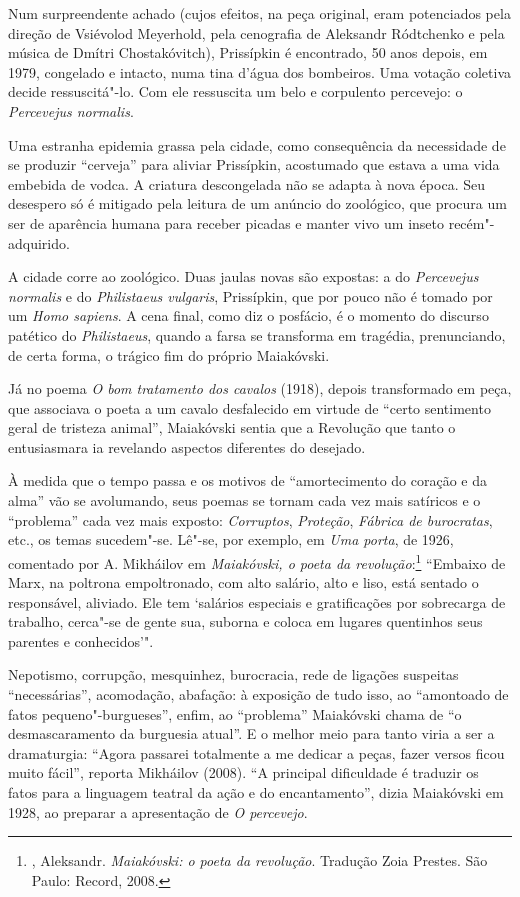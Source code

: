 {{{Num surpreendente achado (cujos efeitos, na peça original, eram
potenciados pela direção de Vsiévolod Meyerhold, pela cenografia de
Aleksandr Ródtchenko e pela música de Dmítri Chostakóvitch), Prissípkin
é encontrado, 50 anos depois, em 1979, congelado e intacto, numa tina
d'água dos bombeiros. Uma votação coletiva decide ressuscitá"-lo. Com ele
ressuscita um belo e corpulento percevejo: o \emph{Percevejus normalis}.

Uma estranha epidemia grassa pela cidade, como consequência da
necessidade de se produzir ``cerveja'' para aliviar Prissípkin, acostumado
que estava a uma vida embebida de vodca. A criatura descongelada não se
adapta à nova época. Seu desespero só é mitigado pela leitura de um
anúncio do zoológico, que procura um ser de aparência humana para
receber picadas e manter vivo um inseto recém"-adquirido.

A cidade corre ao zoológico. Duas jaulas novas são expostas: a do
\emph{Percevejus normalis} e do \emph{Philistaeus vulgaris},
Prissípkin, que por pouco não é tomado por um \emph{Homo sapiens}. A
cena final, como diz o posfácio, é o momento do discurso patético do
\emph{Philistaeus}, quando a farsa se transforma em tragédia,
prenunciando, de certa forma, o trágico fim do próprio Maiakóvski.

Já no poema \emph{O bom tratamento dos cavalos} (1918), depois
transformado em peça, que associava o poeta a um cavalo desfalecido em
virtude de ``certo sentimento geral de tristeza animal'', Maiakóvski
sentia que a Revolução que tanto o entusiasmara ia revelando aspectos
diferentes do desejado.

À medida que o tempo passa e os motivos de ``amortecimento do coração e
da alma'' vão se avolumando, seus poemas se tornam cada vez mais
satíricos e o ``problema'' cada vez mais exposto: \emph{Corruptos},
\emph{Proteção}, \emph{Fábrica de burocratas}, etc., os temas
sucedem"-se. Lê"-se, por exemplo, em \emph{Uma porta}, de 1926, comentado
por A. Mikháilov em \emph{Maiakóvski, o poeta da revolução}:\footnote{,
  Aleksandr. \emph{Maiakóvski: o poeta da revolução}. Tradução Zoia
  Prestes. São Paulo: Record, 2008.} ``Embaixo de Marx, na poltrona
empoltronado, com alto salário, alto e liso, está sentado o responsável,
aliviado. Ele tem `salários especiais e gratificações por sobrecarga de
trabalho, cerca"-se de gente sua, suborna e coloca em lugares quentinhos
seus parentes e conhecidos'".

Nepotismo, corrupção, mesquinhez, burocracia, rede de ligações suspeitas
``necessárias'', acomodação, abafação: à exposição de tudo isso, ao
``amontoado de fatos pequeno"-burgueses'', enfim, ao ``problema'' Maiakóvski
chama de ``o desmascaramento da burguesia atual''. E o melhor meio para
tanto viria a ser a dramaturgia: ``Agora passarei totalmente a me dedicar
a peças, fazer versos ficou muito fácil'', reporta Mikháilov (2008). ``A
principal dificuldade é traduzir os fatos para a linguagem teatral da
ação e do encantamento'', dizia Maiakóvski em 1928, ao preparar a
apresentação de \emph{O percevejo}.

}}}

